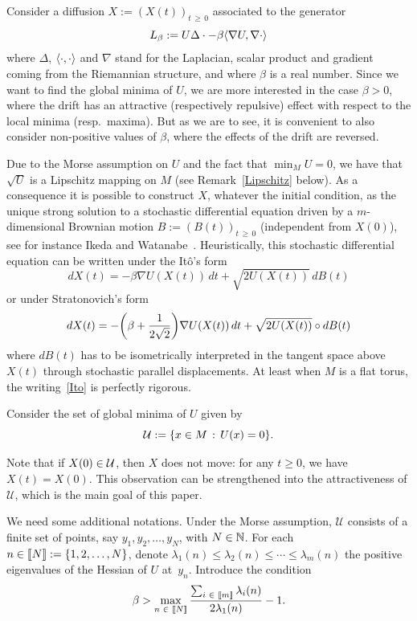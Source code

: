 \documentclass[AHL,Unicode,longabstracts,published]{cedram}
\newcommand{\f}[2]{\frac{#1}{#2}}
\newcommand{\cU}{\mathcal{U}}
\newcommand{\NN}{\mathbb{N}}
\newcommand{\na}{\nabla}
\newcommand{\tr}{\Delta}
\let\originalleft\left
\let\originalright\right
\renewcommand{\left}{\mathopen{}\mathclose\bgroup\originalleft}
\renewcommand{\right}{\aftergroup\egroup\originalright}
\let\oldin\in
\renewcommand{\in}{\mathchoice{\oldin}{\oldin}{\,\oldin\,}{\,\oldin\,}}
\newcommand{\llbracket}{\mathopen{[\mkern -2.7mu[}}
\newcommand{\rrbracket}{\mathclose{]\mkern -2.7mu]}}
\newcommand{\lin}{\llbracket}
\newcommand{\rin}{\rrbracket}
\begin{document}
Consider a diffusion $X:= (X(t))_{t\,\geq\,0}$ associated to the generator
\begin{equation*}
L_\beta := U \tr \cdot-\beta\left\langle \na U,\na \cdot\right\rangle
\end{equation*}
where $\tr$, $\left\langle\cdot,\cdot\right\rangle$ and $\na$ stand for the Laplacian, scalar product and gradient coming from the Riemannian structure, and where $\beta$ is a real number. Since we want to find the global minima of $U$, we are more interested in the case $\beta>0$, where the drift has an attractive (respectively repulsive) effect with respect to the local minima (resp.\ maxima). But as we are to see, it is convenient to also consider non-positive values of $\beta$, where the effects of the drift are reversed.


Due to the Morse assumption on $U$ and the fact that $\min_MU=0$, we have that $\sqrt{U}$ is a Lipschitz mapping on $M$ (see Remark~\ref{Lipschitz} below). As a consequence it is possible to construct $X$, whatever the initial condition, as the unique strong solution to a stochastic differential equation driven by a $m$-dimensional Brownian motion $B:= (B(t))_{t\,\geq\,0}$ (independent from $X(0)$), see for
instance Ikeda and Watanabe~\cite{MR1011252}. Heuristically, this stochastic differential equation can be written under the Itô's form
\begin{equation}\label{Ito} 
dX(t)=-\beta\na U(X(t))
\,
dt +\sqrt{2 U(X(t))}\, dB(t)
\end{equation}
or under Stratonovich's form
\begin{equation*}
dX(t) = -\left(\beta+\f{1}{2\sqrt{2}}\right)\na U(X(t))\, dt +\sqrt{2 U(X(t))}\circ dB(t)
\end{equation*} where $dB(t)$ has to be isometrically interpreted in the tangent space above $X(t)$ through stochastic parallel displacements. At least when $M$ is a flat torus, the writing~\eqref{Ito} is perfectly rigorous.


Consider the set of global minima of $U$ given by
\begin{equation*}
\cU := \{x\in M\,:\, U(x)=0\}.
\end{equation*}


Note that if $X(0)\in\cU$, then $X$ does not move: for any $t\geq 0$, we have $X(t)=X(0)$. This observation can be strengthened into the attractiveness of $\cU$, which is the main goal of this paper.

We need some additional notations. Under the Morse assumption, $\cU$ consists of a finite set of points, say $y_1, y_2,\dots, y_N$, with $N\in\NN$. For each $n\in\lin N\rin:=\{1,2,\dots, N\}$, denote $\lambda_1(n)\leq \lambda_2(n)\leq \cdots \leq \lambda_m(n)$ the positive eigenvalues of the Hessian of $U$ at~$y_n$. Introduce the condition
\begin{equation}\label{H}
\beta > \max_{n\in\lin N\rin}\f{\sum_{i\in\lin m\rin}\lambda_i(n)}{2\lambda_1(n)}-1.
\end{equation}
\end{document}
